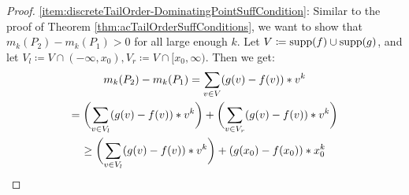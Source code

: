 \documentclass[a4paper]{scrreprt}
\begin{document}
    \begin{proof}
        \ref{item:discreteTailOrder-DominatingPointSuffCondition}:
        Similar to the proof of Theorem \ref{thm:acTailOrderSuffConditions}, we want to show that $m_k(P_2) - m_k(P_1) > 0$ for all large enough $k$.
        Let $V \coloneqq \operatorname{supp}(f) \cup \operatorname{supp}(g)$, and let $V_l \coloneqq V \cap (-\infty, x_0), V_r \coloneqq V \cap [x_0, \infty)$.
        Then we get:
        \begin{multline*}
            m_k(P_2) - m_k(P_1)
            = \sum_{v \in V} (g(v) - f(v))*v^k \\
            = \biggl(\sum_{v \in V_l} (g(v) - f(v))*v^k\biggr) + \biggl(\sum_{v \in V_r} (g(v) - f(v))*v^k\biggr) \\
            \geq \biggl(\sum_{v \in V_l} (g(v) - f(v))*v^k\biggr) + (g(x_0) - f(x_0))*x_0^k
        \end{multline*}
        


\end{proof}
\end{document}
